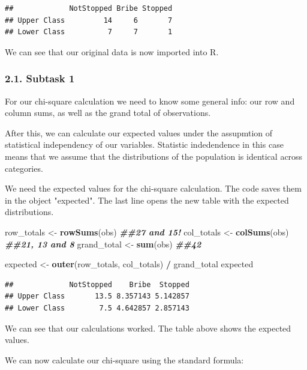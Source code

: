 \documentclass[
]{article}
\newenvironment{Shaded}{\begin{snugshade}}{\end{snugshade}}
\newcommand{\DocumentationTok}[1]{\textcolor[rgb]{0.56,0.35,0.01}{\textbf{\textit{#1}}}}
\newcommand{\FunctionTok}[1]{\textcolor[rgb]{0.13,0.29,0.53}{\textbf{#1}}}
\newcommand{\NormalTok}[1]{#1}
\newcommand{\OtherTok}[1]{\textcolor[rgb]{0.56,0.35,0.01}{#1}}
\newcommand{\SpecialCharTok}[1]{\textcolor[rgb]{0.81,0.36,0.00}{\textbf{#1}}}
\begin{document}
\begin{verbatim}
##             NotStopped Bribe Stopped
## Upper Class         14     6       7
## Lower Class          7     7       1
\end{verbatim}

We can see that our original data is now imported into R. \newline


\subsubsection{2.1. Subtask 1}\label{Question-1-Subtask-1}
For our chi-square calculation we need to know some general info: our row and column sums, as well as the grand total of observations. 

After this, we can calculate our expected values under the assupmtion of statistical independency of our variables. Statistic indedendence in this case means that we assume that the distributions of the population is identical across categories.

We need the expected values for the chi-square calculation. The code saves them in the object "expected". The last line opens the new table with the expected distributions.

\begin{Shaded}
\begin{Highlighting}[]
\NormalTok{row\_totals }\OtherTok{\textless{}{-}} \FunctionTok{rowSums}\NormalTok{(obs) }\DocumentationTok{\#\#27 and 15!}
\NormalTok{col\_totals }\OtherTok{\textless{}{-}} \FunctionTok{colSums}\NormalTok{(obs) }\DocumentationTok{\#\#21, 13 and 8}
\NormalTok{grand\_total }\OtherTok{\textless{}{-}} \FunctionTok{sum}\NormalTok{(obs) }\DocumentationTok{\#\#42}

\NormalTok{expected }\OtherTok{\textless{}{-}} \FunctionTok{outer}\NormalTok{(row\_totals, col\_totals) }\SpecialCharTok{/}\NormalTok{ grand\_total}
\NormalTok{expected}
\end{Highlighting}
\end{Shaded}

\begin{verbatim}
##             NotStopped    Bribe  Stopped
## Upper Class       13.5 8.357143 5.142857
## Lower Class        7.5 4.642857 2.857143
\end{verbatim}

We can see that our calculations worked. The table above shows the expected values.

We can now calculate our chi-square using the standard formula:
\end{document}

